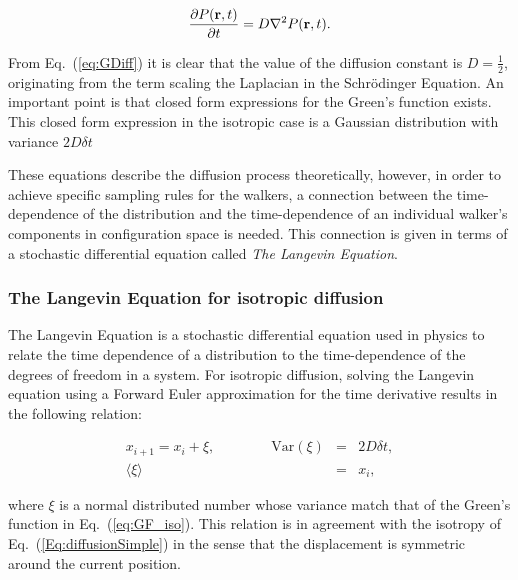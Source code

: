 \begin{equation}
 \label{Eq:diffusionSimple}
 \frac{\partial P(\mathbf{r}, t)}{\partial t} = D\nabla^2 P(\mathbf{r}, t) .
\end{equation}

From Eq.~(\ref{eq:GDiff}) it is clear that the value of the diffusion constant is $D=\frac{1}{2}$, originating from the term scaling the Laplacian in the Schrödinger Equation. An important point is that closed form expressions for the Green's function exists. This closed form expression in the isotropic case is a Gaussian distribution with variance $2D\delta t$ \cite{abInitioMC}


These equations describe the diffusion process theoretically, however, in order to achieve specific sampling rules for the walkers, a connection between the time-dependence of the distribution and the time-dependence of an individual walker's components in configuration space is needed. This connection is given in terms of a stochastic differential equation called \textit{The Langevin Equation}.

\subsubsection{The Langevin Equation for isotropic diffusion}

The Langevin Equation is a stochastic differential equation used in physics to relate the time dependence of a distribution to the time-dependence of the degrees of freedom in a system. For isotropic diffusion, solving the Langevin equation using a Forward Euler approximation for the time derivative results in the following relation:

\begin{eqnarray}
\label{eq:langevinSolSimple}
 x_{i+1} = x_i + \xi, \qquad\qquad \mathrm{Var}(\xi) &=& 2D\delta t, \\
			     \langle\xi\rangle &=& x_i, \nonumber 
\end{eqnarray}

where $\xi$ is a normal distributed number whose variance match that of the Green's function in Eq.~(\ref{eq:GF_iso}). This relation is in agreement with the isotropy of Eq.~(\ref{Eq:diffusionSimple}) in the sense that the displacement is symmetric around the current position.



